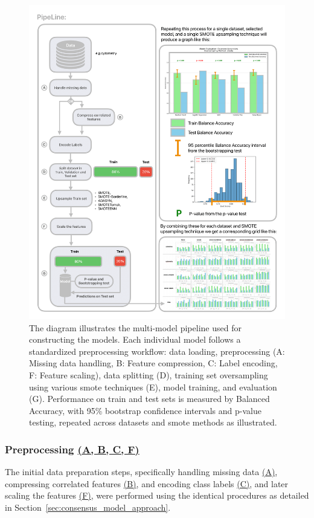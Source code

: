 \documentclass[12pt,a4paper]{report}
\begin{document}
\begin{figure}[H]
  \centering
  \hspace*{-0.9cm} %
  \includegraphics[width=1.1\textwidth]{images/Pipeline-2.png} %
  \caption[Feature Identification models pipeline diagram]{ The diagram illustrates the multi-model pipeline used for constructing the models.  Each individual model follows a standardized preprocessing workflow: data loading, preprocessing (A: Missing data handling, B: Feature compression, C: Label encoding, F: Feature scaling), data splitting (D), training set oversampling using various \gls{smote} techniques (E), model training, and evaluation (G). Performance on train and test sets is measured by Balanced Accuracy, with 95\% bootstrap confidence intervals and p-value testing, repeated across datasets and \gls{smote} methods as illustrated.}
  \label{fig:pipeline-2}
\end{figure}

\subsubsection{Preprocessing \hyperref[fig:pipeline-2]{(A, B, C, F)}}
\noindent The initial data preparation steps, specifically handling missing data \hyperref[fig:pipeline-2]{(A)}, compressing correlated features \hyperref[fig:pipeline-2]{(B)}, and encoding class labels \hyperref[fig:pipeline-2]{(C)}, and later scaling the features \hyperref[fig:pipeline-2]{(F)}, were performed using the identical procedures as detailed in Section~\ref{sec:consensus_model_approach}.
\end{document}
